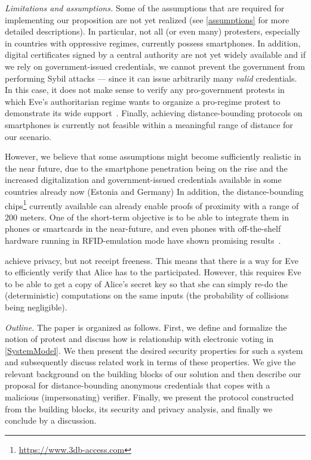 \emph{Limitations and assumptions.} Some of the assumptions that are required for implementing our proposition are not yet realized (see \cref{assumptions} for more detailed descriptions). 
In particular, not all (or even many) protesters, especially in countries with oppressive regimes, currently possess smartphones.
In addition, digital certificates signed by a central authority are not yet widely available and if we rely on government-issued credentials, we cannot prevent the government from performing Sybil attacks --- since it can issue arbitrarily many \emph{valid} credentials. 
In this case, it does not make sense to verify any pro-government protests in which Eve's authoritarian regime wants to organize a pro-regime protest to demonstrate its wide support~\cite[e.g.][]{AlJazeeraOnVenezuela2017,VenezuelanStateWorkersCalledToParticipate}.
Finally, achieving distance-bounding protocols on smartphones is currently not feasible within a meaningful range of distance for our scenario. 

However, we believe that some assumptions might become sufficiently realistic in the near future, due to the smartphone penetration being on the rise and the increased digitalization and government-issued credentials available in some countries already now (\eg Estonia and Germany)
In addition, the distance-bounding chips\footnote{\url{https://www.3db-access.com}} currently available can already enable proofs of proximity with a range of 200 meters.
One of the short-term objective is to be able to integrate them in phones or smartcards in the near-future, and even phones with off-the-shelf hardware running in RFID-emulation mode have shown promising results~\cite{DBonSmartphones}.

\PRIVO achieve privacy, but not receipt freeness.
This means that there is a way for Eve to efficiently verify that Alice has to the participated.
However, this requires Eve to be able to get a copy of Alice's secret key so that she can simply re-do the (deterministic) computations on the same inputs (the probability of collisions being negligible).

\emph{Outline.} The paper is organized as follows. 
First, we define and formalize the notion of protest and discuss how is relationship with electronic voting in \cref{SystemModel}.  
We then present the desired security properties for such a system and subsequently discuss related work in terms of these properties. 
We give the relevant background on the building blocks of our solution \PRIVO and then describe our proposal for distance-bounding anonymous credentials that copes with a malicious (impersonating) verifier. 
Finally, we present the protocol constructed from the building blocks, its security and privacy analysis, and finally we conclude by a discussion. 